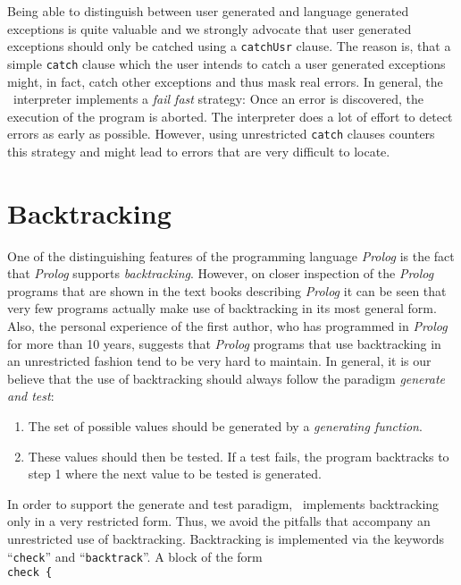 Being able to distinguish between user generated  and language generated exceptions is
quite valuable and we strongly advocate that user generated exceptions should only be
catched using a \texttt{catchUsr} clause.  The reason is, that a simple
\texttt{catch} clause which the user intends to catch a user generated exceptions might,
in fact, catch 
other exceptions and thus mask real errors.  In general, the \setlx\ interpreter
implements a \emph{fail fast} strategy:  Once an error is discovered, the execution of the
program is aborted.  The interpreter does a lot of effort to detect errors as early as
possible.  However, using unrestricted \texttt{catch} clauses counters this strategy and
might lead to errors that are very difficult to locate.

\section{Backtracking}
One of the distinguishing features of the programming language \textsl{Prolog} is the fact
that \textsl{Prolog} supports \emph{backtracking}.  However, on closer inspection of the
\textsl{Prolog} programs that are shown in the text books describing \textsl{Prolog}
\cite{sterling86, bratko90} it can be seen that very few programs actually make use of
backtracking in its most general form.  Also, the personal experience of the first author, who
has programmed in \textsl{Prolog} for more than 10 years, suggests that \textsl{Prolog}
programs that use backtracking in an unrestricted fashion tend to be very hard to maintain.  
In general, it is our believe that the use of backtracking should always follow the
paradigm \emph{generate and test}:
\begin{enumerate}
\item The set of possible values should be generated by a \emph{generating function}.  
\item These values should then be tested.  If a test fails, the program backtracks
      to step 1 where the next value to be tested is generated.
\end{enumerate}
In order to support the generate and test paradigm,  \setlx\ 
implements backtracking only in a very restricted form.  Thus, we avoid the
pitfalls that accompany an unrestricted use of backtracking.
Backtracking is implemented  via the keywords ``\texttt{check}'' and
``\texttt{backtrack}''.  A block of the form
\\[0.2cm]
\hspace*{1.3cm}
\texttt{check \{} 
\\
